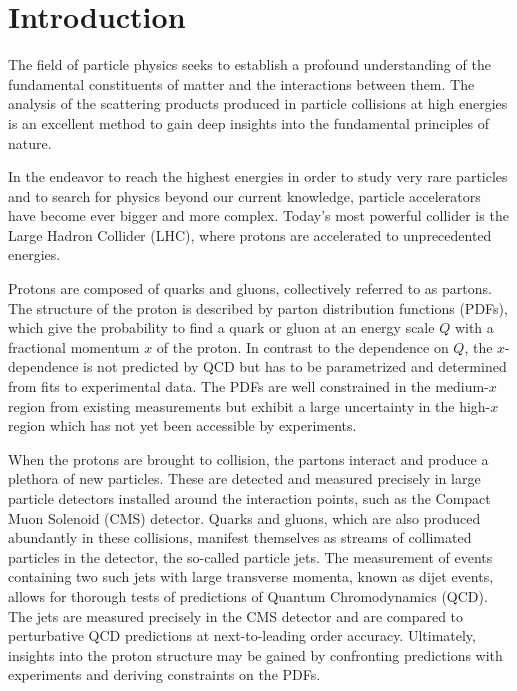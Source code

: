 
\chapter{Introduction}

The field of particle physics seeks to establish a profound understanding
of the fundamental constituents of matter and the interactions between them.
The analysis of the scattering products produced in particle collisions at high
energies is an excellent method to gain deep insights into the fundamental
principles of nature.

In the endeavor to reach the highest energies in order to study very rare
particles and to search for physics beyond our current knowledge, particle
accelerators have become ever bigger and more complex. Today's most powerful collider
is the Large Hadron Collider (LHC), where protons are accelerated to unprecedented energies. 

Protons are composed of quarks and gluons, collectively referred to as partons.
The structure of the proton is described by parton distribution functions
(PDFs), which give the probability to find a quark or gluon at an
energy scale $Q$ with a fractional momentum $x$ of the proton. In contrast to
the dependence on $Q$, the $x$-dependence is not predicted by QCD but has to be parametrized and
determined from fits to experimental data. The PDFs are well constrained in the
medium-$x$ region from existing measurements but exhibit a large uncertainty in
the high-$x$ region which has not yet been accessible by experiments.

When the protons are brought to collision, the partons interact and produce a
plethora of new particles. These are detected and measured precisely in large
particle detectors installed around the interaction points, such as the Compact
Muon Solenoid (CMS) detector. Quarks and gluons, which are also produced
abundantly in these collisions, manifest themselves as streams of collimated
particles in the detector, the so-called particle jets. The measurement of events
containing two such jets with large transverse momenta, known as dijet events,
allows for thorough tests of predictions of Quantum Chromodynamics (QCD). The
jets are measured precisely in the CMS detector and are compared to perturbative
QCD predictions at next-to-leading order accuracy. Ultimately, insights into
the proton structure may be gained by confronting predictions with experiments
and deriving constraints on the PDFs.


